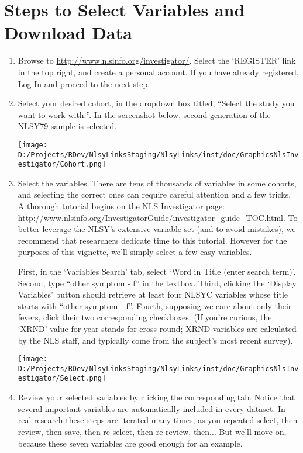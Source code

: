 \documentclass{article}\usepackage[]{graphicx}\usepackage[]{color}
\begin{document}
\section{Steps to Select Variables and Download Data}
\begin{enumerate}
\item Browse to \url{http://www.nlsinfo.org/investigator/}.  Select the `REGISTER' link in the top right, and create a personal account.  If you have already registered, Log In and proceed to the next step.
\item Select your desired cohort, in the dropdown box titled, ``Select the study you want to work with:''.  In the screenshot below, second generation of the NLSY79 sample is selected.

\texttt{[image: D:/Projects/RDev/NlsyLinksStaging/NlsyLinks/inst/doc/GraphicsNlsInvestigator/Cohort.png]}

\item Select the variables.  There are tens of thousands of variables in some cohorts, and selecting the correct ones can require careful attention and a few tricks.  A thorough tutorial begins on the NLS Investigator page: \url{http://www.nlsinfo.org/InvestigatorGuide/investigator_guide_TOC.html}.  To better leverage the NLSY's extensive variable set (and to avoid mistakes), we recommend that researchers dedicate time to this tutorial.  However for the purposes of this vignette, we'll simply select a few easy variables.  

First, in the `Variables Search' tab, select `Word in Title (enter search term)'.  Second, type ``other symptom - f'' in the textbox.  Third, clicking the `Display Variables' button should retrieve at least four NLSYC variables whose title starts with ``other symptom - f''.  Fourth, supposing we care about only their fevers, click their two corresponding checkboxes.  (If you're curious, the `XRND' value for year stands for \href{http://www.bls.gov/nls/nls138.pdf}{cross round}; XRND variables are calculated by the NLS staff, and typically come from the subject's most recent survey).

\texttt{[image: D:/Projects/RDev/NlsyLinksStaging/NlsyLinks/inst/doc/GraphicsNlsInvestigator/Select.png]}

\item Review your selected variables by clicking the corresponding tab.  Notice that several important variables are automatically included in every  dataset.  In real research these steps are iterated many times, as you repeated select, then review, then save, then re-select, then re-review, then...  But we'll move on, because these seven variables are good enough for an example.


\end{enumerate}
\end{document}
